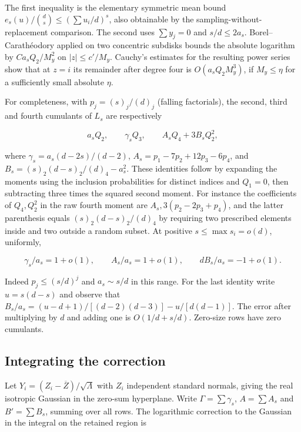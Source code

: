 The first inequality is the elementary symmetric mean bound $e_s(u)/\binom ds\le (\sum u_i/d)^s$, also obtainable by the sampling-without-replacement comparison. The second uses $\sum y_j=0$ and $s/d\le2a_s$. Borel--Carathéodory applied on two concentric subdisks bounds the absolute logarithm by $C a_s Q_2/M_y^2$ on $|z|\le c' / M_y$. Cauchy's estimates for the resulting power series show that at $z=i$ its remainder after degree four is $O(a_s Q_2 M_y^3)$, if $M_y\le\eta$ for a sufficiently small absolute $\eta$.

For completeness, with $p_j=(s)_j/(d)_j$ (falling factorials), the second, third and fourth cumulants of $L_s$ are respectively

\begin{equation*}
a_s Q_2,\qquad \gamma_s Q_3,\qquad A_sQ_4+3B_sQ_2^2,
\end{equation*}

where
$\gamma_s=a_s(d-2s)/(d-2)$, $A_s=p_1-7p_2+12p_3-6p_4$, and $B_s=(s)_2(d-s)_2/(d)_4-a_s^2$. These identities follow by expanding the moments using the inclusion probabilities for distinct indices and $Q_1=0$, then subtracting three times the squared second moment. For instance the coefficients of $Q_4,Q_2^2$ in the raw fourth moment are $A_s,3(p_2-2p_3+p_4)$, and the latter parenthesis equals $(s)_2(d-s)_2/(d)_4$ by requiring two prescribed elements inside and two outside a random subset. At positive $s\le\max s_i=o(d)$, uniformly,

\begin{equation*}
\gamma_s/a_s=1+o(1),\qquad A_s/a_s=1+o(1),\qquad d B_s/a_s=-1+o(1).
\end{equation*}

Indeed $p_j\le (s/d)^j$ and $a_s\sim s/d$ in this range. For the last identity write $u=s(d-s)$ and observe that $B_s/a_s=(u-d+1)/[(d-2)(d-3)]-u/[d(d-1)]$. The error after multiplying by $d$ and adding one is $O(1/d+s/d)$. Zero-size rows have zero cumulants.

\subsection{Integrating the correction}

Let $Y_i=(Z_i-\overline Z)/\sqrt\Lambda$ with $Z_i$ independent standard normals, giving the real isotropic Gaussian in the zero-sum hyperplane. Write $\Gamma=\sum\gamma_s$, $A=\sum A_s$ and $B'=\sum B_s$, summing over all rows. The logarithmic correction to the Gaussian in the integral on the retained region is

